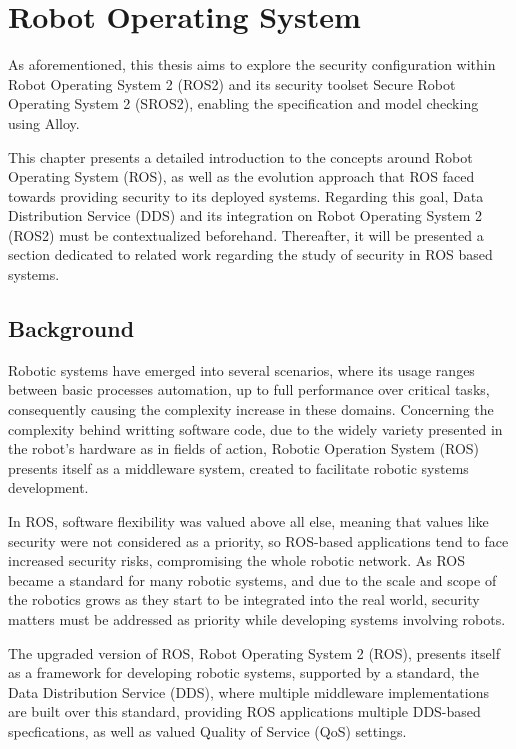\chapter{Robot Operating System}\label{c:ros}

As aforementioned, this thesis aims to explore the security configuration within Robot Operating System 2 (ROS2) and its security toolset Secure Robot Operating System 2 (SROS2), enabling the specification and model checking using Alloy. 

This chapter presents a detailed introduction to the concepts around Robot Operating System (ROS), as well as the evolution approach that ROS faced towards providing security to its deployed systems. Regarding this goal, Data Distribution Service (DDS) and its integration on Robot Operating System 2 (ROS2) must be contextualized beforehand. Thereafter, it will be presented a section dedicated to related work regarding the study of security in ROS based systems.

\section{Background}\label{s:ros-back}

Robotic systems have emerged into several scenarios, where its usage ranges between basic processes automation, up to full performance over critical tasks, consequently causing the complexity increase in these domains. Concerning the complexity behind writting software code, due to the widely variety presented in the robot's hardware as in fields of action, Robotic Operation System (ROS) presents itself as a middleware system, created to facilitate robotic systems development.

In ROS, software flexibility was valued above all else, meaning that values like security were not considered as a priority, so ROS-based applications tend to face increased security risks, compromising the whole robotic network. As ROS became a standard for many robotic systems, and due to the scale and scope of the robotics grows as they start to be integrated into the real world, security matters must be addressed as priority while developing systems involving robots.\cite{diluoffo2018robot, kim2018security}

The upgraded version of ROS, Robot Operating System 2 (ROS), presents itself as a framework for developing robotic systems, supported by a standard, the Data Distribution Service (DDS), where multiple middleware implementations are built over this standard, providing ROS applications multiple DDS-based specfications, as well as valued Quality of Service (QoS) settings. 


